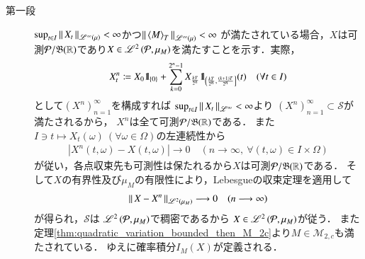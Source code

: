 	\begin{prf}\mbox{}
		\begin{description}
			\item[第一段] $\operatorname*{sup}_{t \in I} \left\|\, X_t\, \right\|_{\mathscr{L}^{\infty} \left(\mu\right)} < \infty$かつ$\Norm{\inprod<M>_T}{\semiLp{\infty}{\mu}} < \infty$
				が満たされている場合，$X$は可測$\mathcal{P}/\mathfrak{B}(\mathbb{R})$であり$X \in \mathscr{L}^{2} \left(\mathcal{P},\mu_M\right)$を満たすことを示す．実際，%
				\begin{align}
					X^n_t \coloneqq X_0 \mbox{1}\hspace{-0.25em}\mbox{l}_{\{0\}} + \sum_{k=0}^{2^n-1} X_{\frac{kT}{2^n}} \mbox{1}\hspace{-0.25em}\mbox{l}_{\left( \frac{kT}{2^n}, \frac{(k+1)T}{2^n}\right]}(t)
					\quad (\forall t \in I)
					\label{eq:thm_left_continuous_adapted_then_predictable}
				\end{align}
				として$\left( X^n \right)_{n=1}^{\infty}$を構成すれば
				$\operatorname*{sup}_{t \in I} \left\|\, X_t\, \right\|_{\mathscr{L}^\infty} < \infty$より
				$\left( X^n \right)_{n=1}^{\infty} \subset \mathcal{S}$が満たされるから，
				$X^n$は全て可測$\mathcal{P}/\mathfrak{B}(\mathbb{R})$である．
				また$I \ni t \longmapsto X_t(\omega)\ (\forall \omega \in \Omega)$の左連続性から
				\begin{align}
					\left| X^n(t,\omega) - X(t,\omega) \right| \longrightarrow 0
					\quad (n \longrightarrow \infty,\ \forall (t,\omega) \in I \times \Omega)
				\end{align}
				が従い，各点収束先も可測性は保たれるから$X$は可測$\mathcal{P}/\mathfrak{B}(\mathbb{R})$である．
				そして$X$の有界性及び$\mu_M$の有限性により，Lebesgueの収束定理を適用して
				\begin{align}
					\left\|\, X - X^n\, \right\|_{\mathscr{L}^{2} \left(\mu_M\right)} \longrightarrow 0 
					\quad (n \longrightarrow \infty)
				\end{align}
				が得られ，$\mathcal{S}$は
				$\mathscr{L}^{2} \left(\mathcal{P},\mu_M\right)$で稠密であるから
				$X \in \mathscr{L}^{2} \left(\mathcal{P},\mu_M\right)$が従う．
				また定理\ref{thm:quadratic_variation_bounded_then_M_2c}より$M \in \mathcal{M}_{2,c}$も満たされている．
				ゆえに確率積分$I_M(X)$が定義される．
				

\end{description}
\end{prf}
